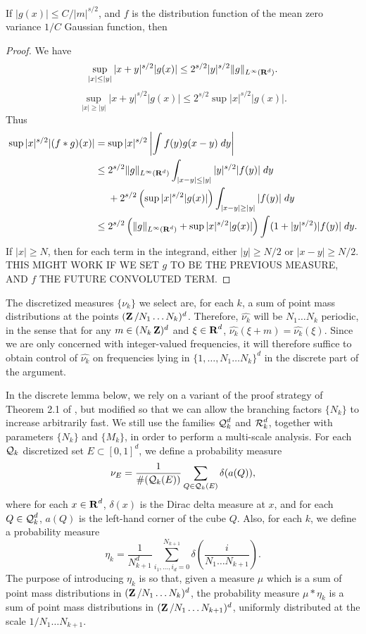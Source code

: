 \begin{lemma}
    If $|g(x)| \leq C/|m|^{s/2}$, and $f$ is the distribution function of the mean zero variance $1/C$ Gaussian function, then
\end{lemma}
\begin{proof}
    We have
    \[ \sup_{|x| \leq |y|} |x + y|^{s/2} |g(x)| \leq 2^{s/2} |y|^{s/2} \| g \|_{L^\infty(\operatorname{\mathbf{R}}^d)}. \]
    \[ \sup_{|x| \geq |y|} |x + y|^{s/2} |g(x)| \leq 2^{s/2} \sup |x|^{s/2} |g(x)|. \]
    Thus
    \begin{align*}
        \sup |x|^{s/2} |(f * g)(x)| &= \sup |x|^{s/2} \left| \int f(y) g(x - y)\; dy \right|\\
        &\leq 2^{s/2} \| g \|_{L^\infty(\operatorname{\mathbf{R}}^d)} \int_{|x - y| \leq |y|} |y|^{s/2} |f(y)|\; dy\\
        &\ \ \ \ + 2^{s/2} \left( \sup |x|^{s/2} |g(x)| \right) \int_{|x-y| \geq |y|} |f(y)|\; dy\\
        &\leq 2^{s/2} \left( \| g \|_{L^\infty(\operatorname{\mathbf{R}}^d)} + \sup |x|^{s/2} |g(x)| \right) \int (1 + |y|^{s/2}) |f(y)|\; dy.
    \end{align*}
    If $|x| \geq N$, then for each term in the integrand, either $|y| \geq N/2$ or $|x - y| \geq N/2$.
    THIS MIGHT WORK IF WE SET $g$ TO BE THE PREVIOUS MEASURE, AND $f$ THE FUTURE CONVOLUTED TERM.
\end{proof}


The discretized measures $\{ \nu_k \}$ we select are, for each $k$, a sum of point mass distributions at the points $(\operatorname{\mathbf{Z}}/N_1 \dots N_k)^d$. Therefore, $\widehat{\nu_k}$ will be $N_1 \dots N_k$ periodic, in the sense that for any $m \in (N_k \operatorname{\mathbf{Z}})^d$ and $\xi \in \operatorname{\mathbf{R}}^d$, $\widehat{\nu_k}(\xi + m) = \widehat{\nu_k}(\xi)$. Since we are only concerned with integer-valued frequencies, it will therefore suffice to obtain control of $\widehat{\nu_k}$ on frequencies lying in $\{ 1, \dots, N_1 \dots N_k \}^d$ in the discrete part of the argument.

In the discrete lemma below, we rely on a variant of the proof strategy of Theorem 2.1 of \cite{Shmerkin}, but modified so that we can allow the branching factors $\{ N_k \}$ to increase arbitrarily fast. We still use the families $\operatorname{\mathcal{Q}}_k^d$ and $\operatorname{\mathcal{R}}_k^d$, together with parameters $\{ N_k \}$ and $\{ M_k \}$, in order to perform a multi-scale analysis. For each $\operatorname{\mathcal{Q}}_k$ discretized set $E \subset [0,1]^d$, we define a probability measure
%
\[ \nu_E = \frac{1}{\#(\operatorname{\mathcal{Q}}_k(E))} \sum_{Q \in \operatorname{\mathcal{Q}}_k(E)} \delta(a(Q)), \]
%
where for each $x \in \operatorname{\mathbf{R}}^d$, $\delta(x)$ is the Dirac delta measure at $x$, and for each $Q \in \operatorname{\mathcal{Q}}_k^d$, $a(Q)$ is the left-hand corner of the cube $Q$. Also, for each $k$, we define a probability measure
%
\[ \eta_k = \frac{1}{N_{k+1}^d} \sum_{i_1, \dots, i_d = 0}^{N_{k+1}} \delta \left( \frac{i}{N_1 \dots N_{k+1}} \right).  \]
%
The purpose of introducing $\eta_k$ is so that, given a measure $\mu$ which is a sum of point mass distributions in $(\operatorname{\mathbf{Z}}/N_1 \dots N_k)^d$, the probability measure $\mu * \eta_k$ is a sum of point mass distributions in $(\operatorname{\mathbf{Z}}/N_1 \dots N_{k+1})^d$, uniformly distributed at the scale $1/N_1 \dots N_{k+1}$.

